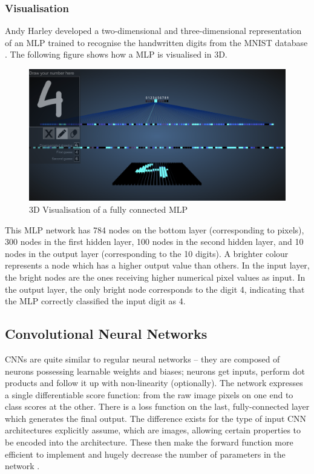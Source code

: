 \subsubsection{Visualisation}
\label{sect5_1_1_3}
Andy Harley developed a two-dimensional and three-dimensional representation of an MLP trained to recognise the handwritten digits from the \ac{MNIST} database \cite{harley2015isvc}. The following figure shows how a MLP is visualised in 3D.\newline\newline
\begin{figure}[h!]
\centering
\includegraphics[width=12cm]{figures/Fully_Connected_MLP_3D.png}
\caption{3D Visualisation of a fully connected MLP \cite{harley2015isvc}}
\label{fig:cnn5}
\end{figure}
This MLP network has 784 nodes on the bottom layer (corresponding to pixels), 300 nodes in the first hidden layer, 100 nodes in the second hidden layer, and 10 nodes in the output layer (corresponding to the 10 digits)\cite{harley2015isvc}. \newline\newline
A brighter colour represents a node which has a higher output value than others. In the input layer, the bright nodes are the ones receiving higher numerical pixel values as input. In the output layer, the only bright node corresponds to the digit 4, indicating that the MLP correctly classified the input digit as 4.

\subsection{Convolutional Neural Networks}
\label{sect5_1_2}
CNNs are quite similar to regular neural networks – they are composed of neurons possessing learnable weights and biases; neurons get inputs, perform dot products and follow it up with non-linearity (optionally). The network expresses a single differentiable score function: from the raw image pixels on one end to class scores at the other. There is a loss function on the last, fully-connected layer which generates the final output. The difference exists for the type of input CNN architectures explicitly assume, which are images, allowing certain properties to be encoded into the architecture. These then make the forward function more efficient to implement and hugely decrease the number of parameters in the network \cite{cnn_stanford}.

